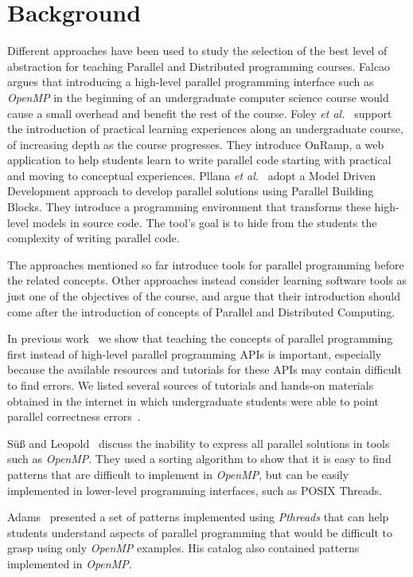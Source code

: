 \section{Background}
\label{sec:background}

Different approaches have been used to study the selection of the best level of
abstraction for teaching Parallel and Distributed programming courses.
Falcao~\cite{6565518} argues that introducing a high-level parallel programming
interface such as \textit{OpenMP} in the beginning of an undergraduate computer
science course would cause a small overhead and benefit the rest of the course.
Foley \textit{et al.}~\cite{FOLEY2017138} support the introduction of practical
learning experiences along an undergraduate course, of increasing depth as the
course progresses. They introduce OnRamp, a web application to help students
learn to write parallel code starting with practical and moving to conceptual
experiences.  Pllana \textit{et al.}~\cite{Pllana:2009} adopt a Model Driven
Development approach to develop parallel solutions using Parallel Building
Blocks. They introduce a programming environment that transforms these
high-level models in source code. The tool's goal is to hide from the students
the complexity of writing parallel code.

The approaches mentioned so far introduce tools for parallel programming before
the related concepts.  Other approaches instead consider learning software
tools as just one of the objectives of the course, and argue that their
introduction should come after the introduction of concepts of Parallel and
Distributed Computing.

In previous work~\cite{goncalves:OpenMPNotEasy} we show that teaching the
concepts of parallel programming first instead of high-level parallel
programming APIs is important, especially because the available resources and
tutorials for these APIs may contain difficult to find errors.  We listed
several sources of tutorials and hands-on materials obtained in the internet in
which undergraduate students were able to point parallel correctness
errors~\cite{SuB:2005:CMO:1892830.1892863}.

Sü\ss{} and Leopold~\cite{Leopold:userOpenMP} discuss the inability to express
all parallel solutions in tools such as \textit{OpenMP}. They used a sorting
algorithm to show that it is easy to find patterns that are difficult to
implement in \textit{OpenMP}, but can be easily implemented in lower-level
programming interfaces, such as POSIX Threads.

Adams~\cite{ADAMS201731} presented a set of patterns implemented using
\textit{Pthreads} that can help students understand aspects of parallel
programming that would be difficult to grasp using only \textit{OpenMP}
examples. His catalog also contained patterns implemented in \textit{OpenMP}.

